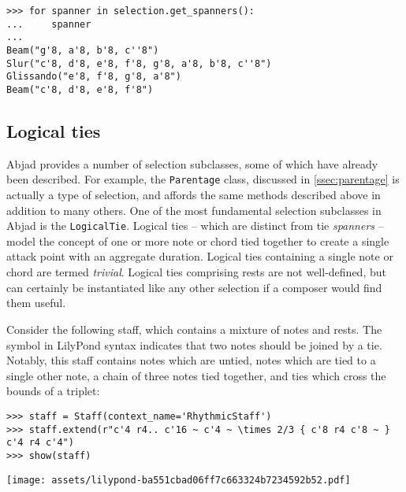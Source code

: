 \begin{abjadbookoutput}
\begin{singlespacing}
\vspace{-0.5\baselineskip}
\begin{lstlisting}
>>> for spanner in selection.get_spanners():
...     spanner
...
Beam("g'8, a'8, b'8, c''8")
Slur("c'8, d'8, e'8, f'8, g'8, a'8, b'8, c''8")
Glissando("e'8, f'8, g'8, a'8")
Beam("c'8, d'8, e'8, f'8")
\end{lstlisting}
\end{singlespacing}
\end{abjadbookoutput}

\subsection{Logical ties}
\label{ssec:logical-ties}

Abjad provides a number of selection subclasses, some of which have already
been described. For example, the \texttt{Parentage} class, discussed in
\autoref{ssec:parentage} is actually a type of selection, and affords the same
methods described above in addition to many others. One of the most fundamental
selection subclasses in Abjad is the \texttt{LogicalTie}. Logical ties -- which
are distinct from tie \emph{spanners} -- model the concept of one or more note
or chord tied together to create a single attack point with an aggregate
duration. Logical ties containing a single note or chord are termed
\emph{trivial}. Logical ties comprising rests are not well-defined, but can
certainly be instantiated like any other selection if a composer would find
them useful.

Consider the following staff, which contains a mixture of notes and rests. The
\texttt{~} symbol in LilyPond syntax indicates that two notes should be joined
by a tie. Notably, this staff contains notes which are untied, notes which are
tied to a single other note, a chain of three notes tied together, and ties
which cross the bounds of a triplet:

\begin{comment}
<abjad>
staff = Staff(context_name='RhythmicStaff')
staff.extend(r"c'4 r4.. c'16 ~ c'4 ~ \times 2/3 { c'8 r4 c'8 ~ } c'4 r4 c'4")
show(staff)
</abjad>
\end{comment}

\begin{abjadbookoutput}
\begin{singlespacing}
\vspace{-0.5\baselineskip}
\begin{lstlisting}
>>> staff = Staff(context_name='RhythmicStaff')
>>> staff.extend(r"c'4 r4.. c'16 ~ c'4 ~ \times 2/3 { c'8 r4 c'8 ~ } c'4 r4 c'4")
>>> show(staff)
\end{lstlisting}
\noindent\texttt{[image: assets/lilypond-ba551cbad06ff7c663324b7234592b52.pdf]}
\end{singlespacing}
\end{abjadbookoutput}

